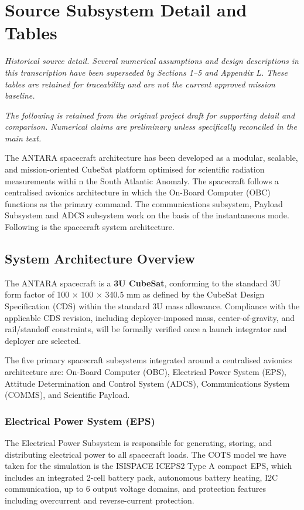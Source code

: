 \section{Source Subsystem Detail and Tables}\label{app:source-03}
\noindent\textit{Historical source detail. Several numerical assumptions and design descriptions in this transcription have been superseded by Sections 1--5 and Appendix L. These tables are retained for traceability and are not the current approved mission baseline.}

\noindent\textit{The following is retained from the original project draft for supporting detail and comparison. Numerical claims are preliminary unless specifically reconciled in the main text.}

The ANTARA spacecraft architecture has been developed as a modular,
scalable, and mission-oriented CubeSat platform optimised for scientific
radiation measurements withi n the South Atlantic Anomaly. The
spacecraft follows a centralised avionics architecture in which the
On-Board Computer (OBC) functions as the primary command. The
communications subsystem, Payload Subsystem and ADCS subsystem work on
the basis of the instantaneous mode. Following is the spacecraft system
architecture.

\subsection{System Architecture Overview}

The ANTARA spacecraft is a \textbf{3U CubeSat}, conforming to the
standard 3U form factor of 100 × 100 × 340.5 mm as defined by the
CubeSat Design Specification (CDS) within the standard 3U mass
allowance. Compliance with the applicable CDS revision, including
deployer-imposed mass, center-of-gravity, and rail/standoff constraints,
will be formally verified once a launch integrator and deployer are
selected.

The five primary spacecraft subsystems integrated around a centralised
avionics architecture are: On-Board Computer (OBC), Electrical Power
System (EPS), Attitude Determination and Control System (ADCS),
Communications System (COMMS), and Scientific Payload.

\subsubsection{Electrical Power System (EPS)}

The Electrical Power Subsystem is responsible for generating, storing,
and distributing electrical power to all spacecraft loads. The COTS
model we have taken for the simulation is the ISISPACE ICEPS2 Type A
compact EPS, which includes an integrated 2-cell battery pack,
autonomous battery heating, I2C communication, up to 6 output voltage
domains, and protection features including overcurrent and
reverse-current protection.


